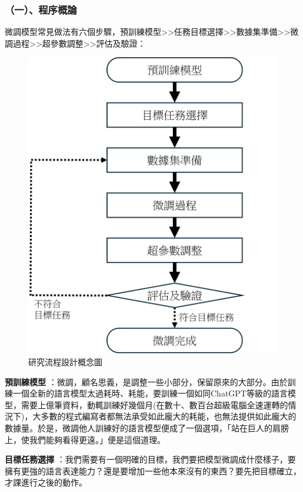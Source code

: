 \documentclass[12pt,a4paper,MingLiU,UTF8,natbib]{article}
\def\xeCJKembold{0.4}
\def\saveCJKnode{\dimen255\lastkern}
\def\restoreCJKnode{\kern-\dimen255\kern\dimen255}
\let\CJKoldsymbol\CJKsymbol
\let\CJKoldpunctsymbol\CJKpunctsymbol
\def\CJKfakeboldsymbol#1{%
	\special{pdf:literal direct 2 Tr \xeCJKembold\space w}%
	\CJKoldsymbol{#1}%
	\saveCJKnode
	\special{pdf:literal direct 0 Tr}%
	\restoreCJKnode}
\def\CJKfakeboldpunctsymbol#1{%
	\special{pdf:literal direct 2 Tr \xeCJKembold\space w}%
	\CJKoldpunctsymbol{#1}%
	\saveCJKnode
	\special{pdf:literal direct 0 Tr}%
	\restoreCJKnode}
\newcommand\CJKfakebold[1]{%
	\let\CJKsymbol\CJKfakeboldsymbol
	\let\CJKpunctsymbol\CJKfakeboldpunctsymbol
	#1%
	\let\CJKsymbol\CJKoldsymbol
	\let\CJKpunctsymbol\CJKoldpunctsymbol}
\begin{document}
	\subsubsection{（一）、程序概論}
	微調模型常見做法有六個步驟，預訓練模型>>任務目標選擇>>數據集準備>>微調過程>>超參數調整>>評估及驗證：
	
	\begin{figure}[H]
		\centering
		\includegraphics[scale=0.9]{flowcahrt}
		\caption{研究流程設計概念圖}
	\end{figure}
	
	\CJKfakebold{\textbf{預訓練模型}}：微調，顧名思義，是調整一些小部分，保留原來的大部分。由於訓練一個全新的語言模型太過耗時、耗能，要訓練一個如同ChatGPT等級的語言模型，需要上億筆資料，動輒訓練好幾個月(在數十、數百台超級電腦全速運轉的情況下)，大多數的程式編寫者都無法承受如此龐大的耗能，也無法提供如此龐大的數據量。於是，微調他人訓練好的語言模型便成了一個選項，「站在巨人的肩膀上，使我們能夠看得更遠。」便是這個道理。
	
	\CJKfakebold{\textbf{目標任務選擇}}：我們需要有一個明確的目標，我們要把模型微調成什麼樣子，要擁有更強的語言表達能力？還是要增加一些他本來沒有的東西？要先把目標確立，才課進行之後的動作。
	
\end{document}
